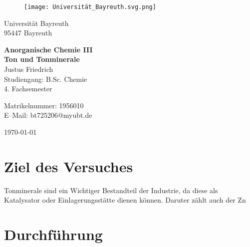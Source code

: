 \documentclass[12pt, a4paper]{article}
\begin{document}
\begin{figure}
    \texttt{[image: Universität\_Bayreuth.svg.png]}
\end{figure}



{\raggedright Universität Bayreuth\\  95447 Bayreuth}


\vspace{5cm}

\begin{center}
{\LARGE\bf{Anorganische Chemie III}} \\  
\vspace{1cm}
{\Large\bf{Ton und Tonminerale}}\\
\vspace{0.5cm}
{\large Justus Friedrich\\}
{Studiengang: B.Sc. Chemie\\}
{4. Fachsemester}
\end{center}





\thispagestyle{empty}
\begin{center}
{\small Matrikelnummer: 1956010 \\
E–Mail:  bt725206@myubt.de}
\end{center}

\vspace{5cm}

\begin{center}
  \today
\end{center}

\newpage
\tableofcontents
\thispagestyle{empty}


\newpage
\setcounter{page}{1}
\section{Ziel des Versuches}
{Tonminerale sind ein Wichtiger Bestandteil der Industrie, da diese als Katalysator oder Einlagerungsstätte dienen können. Daruter zählt auch 
der Zn







}






\newpage
\section{Durchführung}
\end{document}
